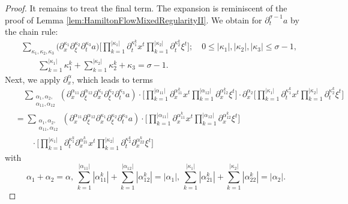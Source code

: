 \documentclass[10pt,a4paper]{amsart}
\begin{document}
\begin{proof}
It remains to treat the final term.
The expansion is reminiscent of the proof of Lemma \ref{lem:HamiltonFlowMixedRegularityII}. We obtain for $\partial_t^{\sigma-1} a$ by the chain rule:
\begin{equation*}
\begin{split}
&\sum_{\kappa_1,\kappa_2, \kappa_3} \big( \partial_x^{\kappa_1} \partial_{\xi}^{\kappa_2} \partial_t^{\kappa_3} a \big) \big[ \prod_{k=1}^{|\kappa_1|} \partial_t^{\kappa_1^k} x^t \prod_{k=1}^{|\kappa_2|} \partial_t^{\kappa_2^k} \xi^t \big]; \quad 0 \leq |\kappa_1|, |\kappa_2|,|\kappa_3| \leq \sigma-1, \\ 
&\quad \quad  \sum_{k=1}^{|\kappa_1|} \kappa_1^k + \sum_{k=1}^{|\kappa_2|} \kappa_2^k + \kappa_3  = \sigma-1.
\end{split}
\end{equation*}
Next, we apply $\partial_x^{\alpha}$, which leads to terms
\begin{equation*}
\begin{split}
&\quad \sum_{\substack{\alpha_1,\alpha_2, \\ \alpha_{11}, \alpha_{12}}} (\partial_x^{\alpha_{11}} \partial_{\xi}^{\alpha_{12}} \partial_x^{\kappa_1} \partial_{\xi}^{\kappa_2} \partial_t^{\kappa_3} a) \cdot \big[ \prod_{k=1}^{|\alpha_{11}|} \partial_x^{\alpha_{11}^k} x^t \prod_{k=1}^{|\alpha_{12}|} \partial_x^{\alpha_{12}^k} \xi^t  \big] \cdot \partial_x^{\alpha_{2}} \big[ \prod_{k=1}^{|\kappa_1|} \partial_t^{\kappa_1^k} x^t \prod_{k=1}^{|\kappa_2|} \partial_t^{\kappa_2^k} \xi^t \big] \\
&= \sum_{\substack{\alpha_1,\alpha_2, \\ \alpha_{11}, \alpha_{12}}} (\partial_x^{\alpha_{11}} \partial_{\xi}^{\alpha_{12}} \partial_x^{\kappa_1} \partial_{\xi}^{\kappa_2} \partial_t^{\kappa_3} a) \cdot \big[ \prod_{k=1}^{|\alpha_{11}|} \partial_x^{\alpha_{11}^k} x^t \prod_{k=1}^{|\alpha_{12}|} \partial_x^{\alpha_{12}^k} \xi^t \big] \\
&\quad \quad \cdot \big[ \prod_{k=1}^{|\kappa_1|} \partial_t^{\kappa_1^k} \partial_x^{\alpha_{21}^k} x^t \prod_{k=1}^{|\kappa_2|} \partial_t^{\kappa_2^k} \partial_x^{\alpha_{22}^k} \xi^t \big]
\end{split}
\end{equation*}
with
\begin{equation*}
    \alpha_1 + \alpha_2 = \alpha, \, \sum_{k=1}^{|\alpha_{11}|} |\alpha_{11}^k| + \sum_{k=1}^{|\alpha_{12}|} |\alpha_{12}^k| = |\alpha_{1}|, \, \sum_{k=1}^{|\kappa_1|} |\alpha_{21}^k | + \sum_{k=1}^{|\kappa_2|} |\alpha_{22}^k| = |\alpha_2|.
\end{equation*}


\end{proof}
\end{document}
